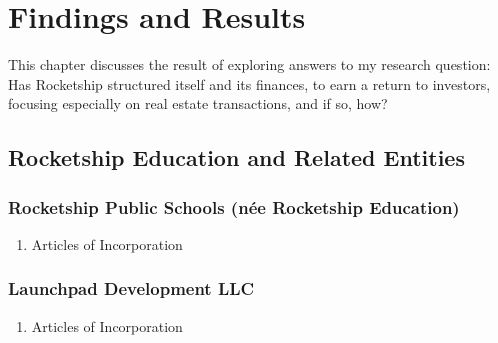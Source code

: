 
\chapter{Findings and Results}\label{ch:results}\noindent
\bigskip%

This chapter discusses the result of exploring answers to my research question: Has Rocketship structured itself and its finances, to earn a return to investors, focusing especially on real estate transactions, and if so, how?

\section{Rocketship Education and Related Entities}
\subsection{Rocketship Public Schools (née Rocketship Education)}
\begin{enumerate}
  \item Articles of Incorporation
\end{enumerate}
\subsection{Launchpad Development LLC}
\begin{enumerate}
  \item Articles of Incorporation
\end{enumerate}

